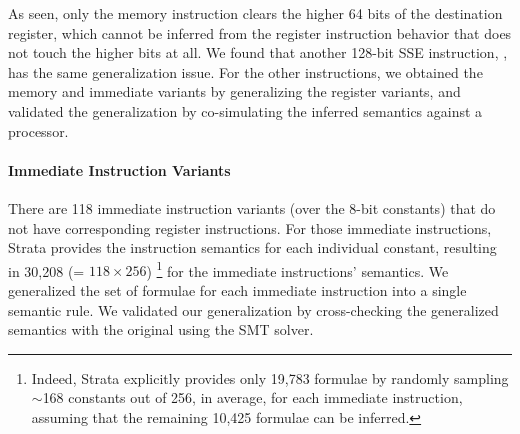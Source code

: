 \noindent As seen, only the memory instruction clears the higher 64 bits of the destination register, which cannot be inferred from the register instruction behavior that does not touch the higher bits at all.
%
We found that another 128-bit SSE instruction, , has the same generalization issue.
%
For the other instructions, we obtained the memory and immediate variants by generalizing the register variants, and validated the generalization by co-simulating the inferred semantics against a processor.


\vspace{-2pt}
\paragraph{Immediate Instruction Variants}

There are 118 immediate instruction variants (over the 8-bit constants) that do not have corresponding register instructions.
For those immediate instructions, Strata provides the instruction semantics for each individual constant, resulting in 30,208 (= $118 \times 256$) \footnote{Indeed, Strata explicitly provides only 19,783 formulae by randomly sampling $\sim$168 constants out of 256, in average, for each immediate instruction, assuming that the remaining 10,425 formulae can be inferred.} for the immediate instructions' semantics.
We generalized the set of formulae for each immediate instruction into a single semantic rule.
We validated our generalization by cross-checking the generalized semantics with the original using the SMT solver.





